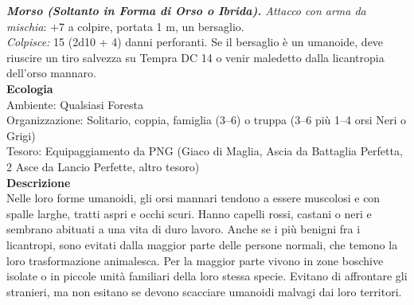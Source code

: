 \begin{multicols}{2}
\emph{\textbf{Morso (Soltanto in Forma di Orso o Ibrida).} Attacco con arma da mischia}: +7 a colpire, portata 1 m, un bersaglio.\\

\emph{Colpisce:} 15 (2d10 + 4) danni perforanti. Se il bersaglio è un umanoide, deve riuscire un tiro salvezza su Tempra DC 14 o venir maledetto dalla licantropia dell'orso mannaro.\\
\textbf{Ecologia}\\
Ambiente: Qualsiasi Foresta\\
Organizzazione: Solitario, coppia, famiglia (3–6) o truppa (3–6 più 1–4 orsi Neri o Grigi)\\
Tesoro: Equipaggiamento da PNG (Giaco di Maglia, Ascia da Battaglia Perfetta, 2 Asce da Lancio Perfette, altro tesoro)\\
\textbf{Descrizione}\\
Nelle loro forme umanoidi, gli orsi mannari tendono a essere muscolosi e con spalle larghe, tratti aspri e occhi scuri. Hanno capelli rossi, castani o neri e sembrano abituati a una vita di duro lavoro. Anche se i più benigni fra i licantropi, sono evitati dalla maggior parte delle persone normali, che temono la loro trasformazione animalesca. Per la maggior parte vivono in zone boschive isolate o in piccole unità familiari della loro stessa specie. Evitano di affrontare gli stranieri, ma non esitano se devono scacciare umanoidi malvagi dai loro territori.\\


\end{multicols}
